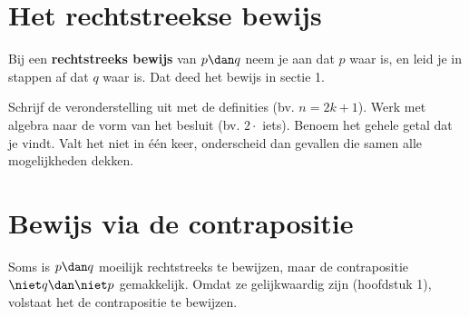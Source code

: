 \begin{oefeningen}

\end{oefeningen}

\section{Het rechtstreekse bewijs}

Bij een \textbf{rechtstreeks bewijs} van $p \dan q$ neem je aan dat $p$ waar is, en leid je in stappen af dat $q$ waar is. Dat deed het bewijs in sectie 1.


\begin{werkwijze}
Schrijf de veronderstelling uit met de definities (bv. $n = 2k + 1$). Werk met algebra naar de vorm van het besluit (bv. $2 \cdot$ iets). Benoem het gehele getal dat je vindt. Valt het niet in één keer, onderscheid dan gevallen die samen alle mogelijkheden dekken.
\end{werkwijze}

\begin{oefeningen}

\end{oefeningen}

\section{Bewijs via de contrapositie}

Soms is $p \dan q$ moeilijk rechtstreeks te bewijzen, maar de contrapositie $\niet q \dan \niet p$ gemakkelijk. Omdat ze gelijkwaardig zijn (hoofdstuk 1), volstaat het de contrapositie te bewijzen.


